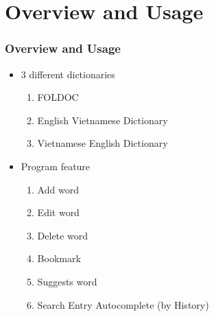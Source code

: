 \section{Overview and Usage}

\begin{frame}
\frametitle{Overview and Usage}
\begin{itemize}
  \item 3 different dictionaries
  \begin{enumerate}[1.]
    \item FOLDOC
    \item English Vietnamese Dictionary
    \item Vietnamese English Dictionary
  \end{enumerate}
  \item Program feature
  \begin{enumerate}[1.]
    \item Add word
    \item Edit word
    \item Delete word
    \item Bookmark
    \item Suggests word
    \item Search Entry Autocomplete (by History)
  \end{enumerate}
\end{itemize}
\end{frame}



